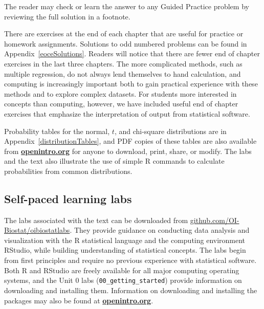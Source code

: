 \begin{exercisewrap}
\begin{nexercise}
The reader may check or learn the answer to any Guided Practice
problem by reviewing the full solution in a footnote.\footnotemark{}
\end{nexercise}
\end{exercisewrap}

There are exercises at the end of each chapter that are useful for practice or homework assignments. Solutions to odd numbered problems can be found in Appendix~\ref{eoceSolutions}. Readers will notice that there are fewer end of chapter exercises in the last three chapters.  The more complicated methods, such as multiple regression, do not always lend themselves to hand calculation, and computing is increasingly important both to gain practical experience with these methods and to explore complex datasets. For students more interested in concepts than computing, however, we have included useful end of chapter exercises that emphasize the interpretation of output from statistical software.

Probability tables for the normal, $t$, and chi-square distributions are in Appendix~\ref{distributionTables}, and PDF copies of these tables are also available from \href{http://www.openintro.org}{\color{black}\textbf{openintro.org}} for anyone to download, print, share, or modify.  The labs and the text also illustrate the use of simple \textsf{R} commands to calculate probabilities from common distributions.

\subsection*{Self-paced learning labs}

The labs associated with the text can be downloaded from \href{https://github.com/OI-Biostat/oi_biostat_labs}{github.com/OI-Biostat/oi\us{}biostat\us{}labs}.  They provide guidance on conducting data analysis and visualization with the \textsf{R} statistical language and the computing environment RStudio, while building understanding of statistical concepts.  The labs begin from first principles and require no previous experience with statistical software. Both \textsf{R} and RStudio are freely available for all major computing operating systems, and the Unit 0 labs (\texttt{00\_getting\_started}) provide information on downloading and installing them. Information on downloading and installing the packages may also be found at \href{http://www.openintro.org}{\color{black}\textbf{openintro.org}}. 

